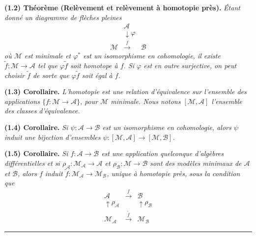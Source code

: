 \documentclass[
  french,
  a3paper,
  a3paper]{extarticle}
\begin{document}
\textbf{(1.2) Théorème (Relèvement et relèvement à homotopie près).}
\emph{Étant donné un diagramme de flèches pleines} \[
\begin{array}{ccc}
&\mathscr A&\\[-2mm]
&\downarrow\scriptstyle\varphi&\\[-2mm]
\mathcal M&\xrightarrow{f}&\mathscr B
\end{array}
\] \emph{où \(\mathcal M\) est minimale et \(\varphi^*\) est un
isomorphisme en cohomologie, il existe
\(\tilde f:\mathcal M\to\mathscr A\) tel que \(\varphi\tilde f\) soit
homotope à \(f\). Si \(\varphi\) est en outre surjective, on peut
choisir \(\tilde f\) de sorte que \(\varphi\tilde f\) soit égal à
\(f\).}

\textbf{(1.3) Corollaire.} \emph{L'homotopie est une relation
d'équivalence sur l'ensemble des applications
\(\{f:\mathcal M\to\mathscr A\}\), pour \(\mathcal M\) minimale. Nous
notons \([\mathcal M,\mathscr A]\) l'ensemble des classes
d'équivalence.}

\textbf{(1.4) Corollaire.} \emph{Si \(\psi:\mathscr A\to\mathscr B\) est
un isomorphisme en cohomologie, alors \(\psi\) induit une bijection
d'ensembles \(\psi:[\mathcal M,\mathscr A]\to[\mathcal M,\mathscr B]\).}

\textbf{(1.5) Corollaire.} \emph{Si \(f:\mathscr A\to\mathscr B\) est
une application quelconque d'algèbres différentielles et si
\(\rho_{\mathscr A}:\mathcal M_{\mathscr A}\to\mathscr A\) et
\(\rho_{\mathscr B}:\mathcal M\to\mathscr B\) sont des modèles minimaux
de \(\mathscr A\) et \(\mathscr B\), alors \(f\) induit
\(\tilde f:\mathcal M_{\mathscr A}\to\mathcal M_{\mathscr B}\), unique à
homotopie près, sous la condition que} \[
\begin{array}{ccc}
\mathscr A&\xrightarrow{f}&\mathscr B\\
\uparrow\scriptstyle\rho_{\mathscr A}&&\uparrow\scriptstyle\rho_{\mathscr B}\\
\mathcal M_{\mathscr A}&\xrightarrow{\tilde f}&\mathcal M_{\mathscr B}
\end{array}
\]

\clearpage



\par

\vspace{0.7mm}\hrule\vspace{1.6mm}
\end{document}
